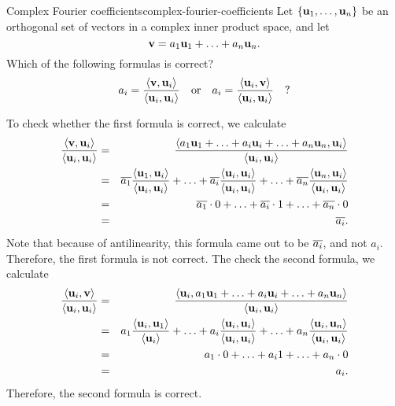 \begin{example}{Complex Fourier coefficients}{complex-fourier-coefficients}
  Let $\set{\vect{u}_1,\ldots,\vect{u}_n}$ be an orthogonal set of
  vectors in a complex inner product space, and let
  \begin{equation*}
    \vect{v} = a_1\vect{u}_1 + \ldots + a_n\vect{u}_n.
  \end{equation*}
  Which of the following formulas is correct?
  \begin{equation*}
    a_i = \frac{\iprod{\vect{v},\vect{u}_i}}{\iprod{\vect{u}_i,\vect{u}_i}}
    \quad\mbox{or}\quad
    a_i = \frac{\iprod{\vect{u}_i,\vect{v}}}{\iprod{\vect{u}_i,\vect{u}_i}}
    \quad?
  \end{equation*}
\end{example}

\begin{solution}
  To check whether the first formula is correct, we calculate
  \begin{eqnarray*}
    \frac{\iprod{\vect{v},\vect{u}_i}}{\iprod{\vect{u}_i,\vect{u}_i}}
    &=&
        \frac{\iprod{a_1\vect{u}_1 + \ldots + a_i\vect{u}_i + \ldots + a_n\vect{u}_n,\vect{u}_i}}{\iprod{\vect{u}_i,\vect{u}_i}} \\
    &=&
        \conjugate{a_1}\frac{\iprod{\vect{u}_1,\vect{u}_i}}{\iprod{\vect{u}_i,\vect{u}_i}}
        + \ldots
        + \conjugate{a_i}\frac{\iprod{\vect{u}_i,\vect{u}_i}}{\iprod{\vect{u}_i,\vect{u}_i}}
        + \ldots
        + \conjugate{a_n}\frac{\iprod{\vect{u}_n,\vect{u}_i}}{\iprod{\vect{u}_i,\vect{u}_i}} \\
    &=&
        \conjugate{a_1}\cdot 0
        + \ldots
        + \conjugate{a_i}\cdot 1
        + \ldots
        + \conjugate{a_n}\cdot 0 \\
    &=&
        \conjugate{a_i}.
  \end{eqnarray*}
  Note that because of antilinearity, this formula came out to be
  $\overline{a_i}$, and not $a_i$. Therefore, the first formula is
  not correct.  The check the second formula, we calculate
  \begin{eqnarray*}
    \frac{\iprod{\vect{u}_i,\vect{v}}}{\iprod{\vect{u}_i,\vect{u}_i}}
    &=&
        \frac{\iprod{\vect{u}_i,a_1\vect{u}_1 + \ldots + a_i\vect{u}_i + \ldots + a_n\vect{u}_n}}{\iprod{\vect{u}_i,\vect{u}_i}} \\
    &=&
        a_1\frac{\iprod{\vect{u}_i,\vect{u}_1}}{\iprod{\vect{u}_i}}
        + \ldots
        + a_i\frac{\iprod{\vect{u}_i,\vect{u}_i}}{\iprod{\vect{u}_i,\vect{u}_i}}
        + \ldots
        + a_n\frac{\iprod{\vect{u}_i,\vect{u}_n}}{\iprod{\vect{u}_i,\vect{u}_i}} \\
    &=&
        a_1\cdot 0
        + \ldots
        + a_i 1
        + \ldots
        + a_n\cdot 0 \\
    &=&
        a_i.
  \end{eqnarray*}
  Therefore, the second formula is correct.
\end{solution}

